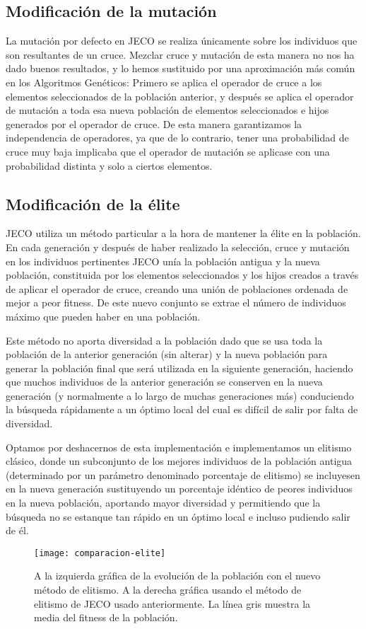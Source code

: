 \subsection{Modificación de la mutación}
La mutación por defecto en JECO se realiza únicamente sobre los individuos que son resultantes de un cruce. Mezclar cruce y mutación de esta manera no nos ha dado buenos resultados, y lo hemos sustituido por una aproximación más común en los Algoritmos Genéticos: Primero se aplica el operador de cruce a los elementos seleccionados de la población anterior, y después se aplica el operador de mutación a toda esa nueva población de elementos seleccionados e hijos generados por el operador de cruce. De esta manera garantizamos la independencia de operadores, ya que de lo contrario, tener una probabilidad de cruce muy baja implicaba que el operador de mutación se aplicase con una probabilidad distinta y solo a ciertos elementos.

\subsection{Modificación de la élite}
JECO utiliza un método particular a la hora de mantener la élite en la población. En cada generación y después de haber realizado la selección, cruce y mutación en los individuos pertinentes JECO unía la población antigua y la nueva población, constituida por los elementos seleccionados y los hijos creados a través de aplicar el operador de cruce, creando una unión de poblaciones ordenada de mejor a peor fitness. De este nuevo conjunto se extrae el número de individuos máximo que pueden haber en una población.

Este método no aporta diversidad a la población dado que se usa toda la población de la anterior generación (sin alterar) y la nueva población para generar la población final que será utilizada en la siguiente generación, haciendo que muchos individuos de la anterior generación se conserven en la nueva generación (y normalmente a lo largo de muchas generaciones más) conduciendo la búsqueda rápidamente a un óptimo local del cual es difícil de salir por falta de diversidad.

Optamos por deshacernos de esta implementación e implementamos un elitismo clásico, donde un subconjunto de los mejores individuos de la población antigua (determinado por un parámetro denominado porcentaje de elitismo) se incluyesen en la nueva generación sustituyendo un porcentaje idéntico de peores individuos en la nueva población, aportando mayor diversidad y permitiendo que la búsqueda no se estanque tan rápido en un óptimo local e incluso pudiendo salir de él.
\begin{figure}[H]
\centering
\texttt{[image: comparacion-elite]}
\caption{A la izquierda gráfica de la evolución de la población con el nuevo método de elitismo. A la derecha gráfica usando el método de elitismo de JECO usado anteriormente. La línea gris muestra la media del fitness de la población.}
\end{figure}

